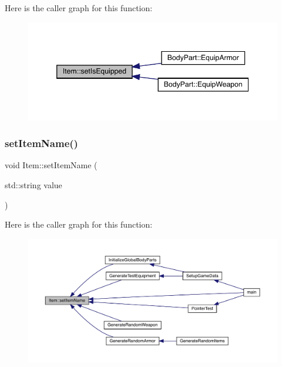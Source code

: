 Here is the caller graph for this function\+:
\nopagebreak
\begin{figure}[H]
\begin{center}
\leavevmode
\includegraphics[width=346pt]{dc/d32/class_item_ade0d63a4f02aa1a97f977b13f96eb891_icgraph}
\end{center}
\end{figure}
\mbox{\label{class_item_ae8dd38d585a7795f134f6453feb1000e}} 
\subsubsection{\texorpdfstring{set\+Item\+Name()}{setItemName()}}
{\footnotesize\ttfamily void Item\+::set\+Item\+Name (\begin{DoxyParamCaption}\item[{std\+::string}]{value }\end{DoxyParamCaption})}

Here is the caller graph for this function\+:
\nopagebreak
\begin{figure}[H]
\begin{center}
\leavevmode
\includegraphics[width=350pt]{dc/d32/class_item_ae8dd38d585a7795f134f6453feb1000e_icgraph}
\end{center}
\end{figure}
\mbox{\label{class_item_a3d6c15b2f0a37709541086df917aa761}} 
